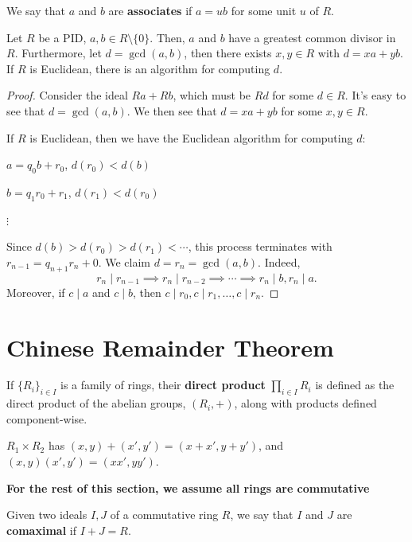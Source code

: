 \begin{defn}
    We say that $a$ and $b$ are \textbf{associates} if $a=ub$ for some unit $u$ of $R$.
\end{defn}

\begin{thm}
    Let $R$ be a PID, $a,b \in R\setminus \{0\}$. Then, $a$ and $b$ have a greatest common divisor in $R$. Furthermore, let $d=\gcd(a,b)$, then there exists $x,y \in R$ with $d=xa+yb$. If $R$ is Euclidean, there is an algorithm for computing $d$.
\end{thm}

\begin{proof}
    Consider the ideal $Ra+Rb$, which must be $Rd$ for some $d \in R$. It's easy to see that $d= \gcd (a,b)$. We then see that $d=xa+yb$ for some $x,y \in R$.

    If $R$ is Euclidean, then we have the Euclidean algorithm for computing $d:$

    $a=q_0b+r_0$, $d(r_0) < d(b)$

    $b=q_1r_0+r_1$, $d(r_1) < d(r_0)$

    $\vdots$

    Since $d(b)>d(r_0)>d(r_1)<\cdots$, this process terminates with $r_{n-1}=q_{n+1}r_n+0$. We claim $d = r_n=\gcd(a,b)$. Indeed,
    $$r_n \mid r_{n-1}\implies r_n \mid r_{n-2}\implies \cdots \implies r_n \mid b,r_n \mid a.$$
    Moreover, if $c \mid a$ and $c \mid b$, then $c \mid r_0,c\mid r_1,\dots,c \mid r_n$.
\end{proof}

\section{Chinese Remainder Theorem}

\begin{defn}
    If $\{R_i\}_{i \in I}$ is a family of rings, their \textbf{direct product} $\prod_{i \in I}R_i$ is defined as the direct product of the abelian groups, $(R_i,+)$, along with products defined component-wise.
\end{defn}

\begin{ex}
    $R_1 \times R_2$ has $(x,y)+(x',y')=(x+x',y+y')$, and $(x,y)(x',y')=(xx',yy')$.
\end{ex}

\textbf{For the rest of this section, we assume all rings are commutative}

\begin{defn}
    Given two ideals $I,J$ of a commutative ring $R$, we say that $I$ and $J$ are \textbf{comaximal} if $I+J=R$.
\end{defn}

